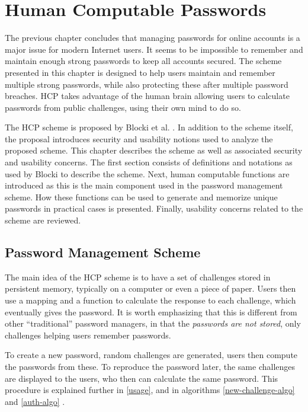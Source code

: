 \chapter{Human Computable Passwords}\label{ch:hcp}
The previous chapter concludes that managing passwords for online accounts is a major issue for modern Internet users. It seems to be impossible to remember and maintain enough strong passwords to keep all accounts secured. The scheme presented in this chapter is designed to help users maintain and remember multiple strong passwords, while also protecting these after multiple password breaches. HCP takes advantage of the human brain allowing users to calculate passwords from public challenges, using their own mind to do so. 

\par The HCP scheme is proposed by Blocki et al. \cite{hcp-blocki}. In addition to the scheme itself, the proposal introduces security and usability notions used to analyze the proposed scheme. This chapter describes the scheme as well as associated security and usability concerns. The first section consists of definitions and notations as used by Blocki \cite{hcp-blocki} to describe the scheme. Next, human computable functions are introduced as this is the main component used in the password management scheme. How these functions can be used to generate and memorize unique passwords in practical cases is presented. Finally, usability concerns related to the scheme are reviewed.

\section{Password Management Scheme}
The main idea of the HCP scheme is to have a set of challenges stored in persistent memory, typically on a computer or even a piece of paper. Users then use a mapping and a function to calculate the response to each challenge, which eventually gives the password. It is worth emphasizing that this is different from other ``traditional'' password managers, in that the \emph{passwords are not stored}, only challenges helping users remember passwords. 
\par To create a new password, random challenges are generated, users then compute the passwords from these. To reproduce the password later, the same challenges are displayed to the users, who then can calculate the same password. This procedure is explained further in \autoref{usage}, and in algorithms \ref{new-challenge-algo} and \ref{auth-algo} .

